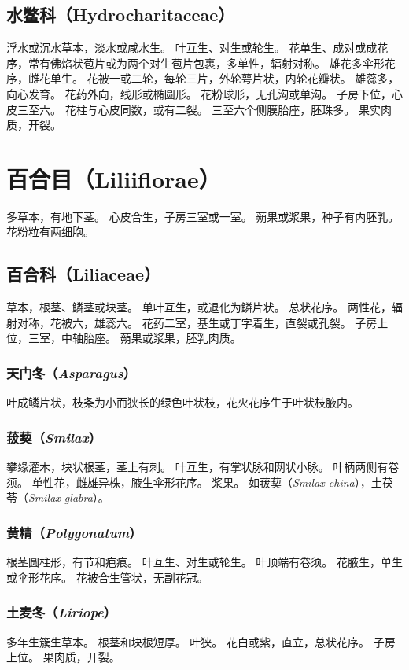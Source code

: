 \documentclass[11pt]{article}
\begin{document}
\begin{sloppypar}
\subsection{水鳖科（Hydrocharitaceae）}
浮水或沉水草本，淡水或咸水生。
叶互生、对生或轮生。
花单生、成对或成花序，常有佛焰状苞片或为两个对生苞片包裹，多单性，辐射对称。
雄花多伞形花序，雌花单生。
花被一或二轮，每轮三片，外轮萼片状，内轮花瓣状。
雄蕊多，向心发育。
花药外向，线形或椭圆形。
花粉球形，无孔沟或单沟。
子房下位，心皮三至六。
花柱与心皮同数，或有二裂。
三至六个侧膜胎座，胚珠多。
果实肉质，开裂。

\section{百合目（Liliiflorae）}
多草本，有地下茎。
心皮合生，子房三室或一室。
蒴果或浆果，种子有内胚乳。
花粉粒有两细胞。

\subsection{百合科（Liliaceae）}
草本，根茎、鳞茎或块茎。
单叶互生，或退化为鳞片状。
总状花序。
两性花，辐射对称，花被六，雄蕊六。
花药二室，基生或丁字着生，直裂或孔裂。
子房上位，三室，中轴胎座。
蒴果或浆果，胚乳肉质。

\subsubsection{天门冬（\textit{Asparagus}）}
叶成鳞片状，枝条为小而狭长的绿色叶状枝，花火花序生于叶状枝腋内。

\subsubsection{菝葜（\textit{Smilax}）}
攀缘灌木，块状根茎，茎上有刺。
叶互生，有掌状脉和网状小脉。
叶柄两侧有卷须。
单性花，雌雄异株，腋生伞形花序。
浆果。
如菝葜（\textit{Smilax china}），土茯苓（\textit{Smilax glabra}）。

\subsubsection{黄精（\textit{Polygonatum}）}
根茎圆柱形，有节和疤痕。
叶互生、对生或轮生。
叶顶端有卷须。
花腋生，单生或伞形花序。
花被合生管状，无副花冠。

\subsubsection{土麦冬（\textit{Liriope}）}
多年生簇生草本。
根茎和块根短厚。
叶狭。
花白或紫，直立，总状花序。
子房上位。
果肉质，开裂。


\end{sloppypar}
\end{document}
